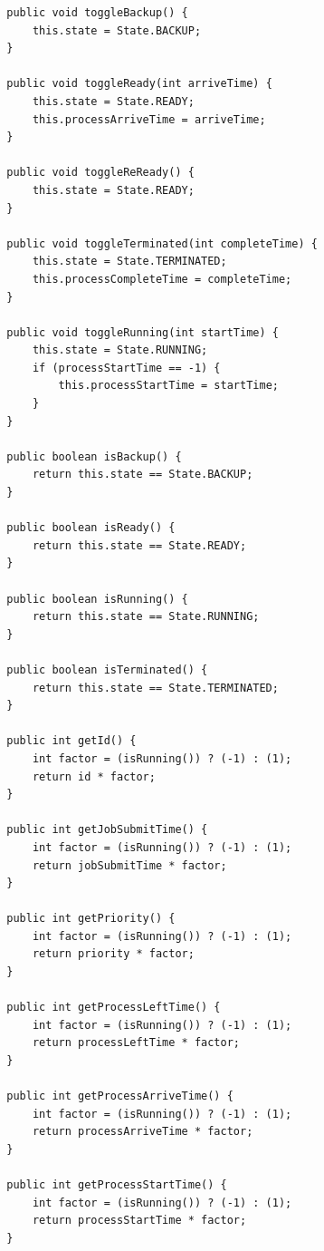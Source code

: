 \documentclass[12pt, a4paper, UTF8]{ctexart}
\begin{document}
\begin{verbatim}
        public void toggleBackup() {
            this.state = State.BACKUP;
        }
    
        public void toggleReady(int arriveTime) {
            this.state = State.READY;
            this.processArriveTime = arriveTime;
        }
    
        public void toggleReReady() {
            this.state = State.READY;
        }
    
        public void toggleTerminated(int completeTime) {
            this.state = State.TERMINATED;
            this.processCompleteTime = completeTime;
        }
    
        public void toggleRunning(int startTime) {
            this.state = State.RUNNING;
            if (processStartTime == -1) {
                this.processStartTime = startTime;
            }
        }
    
        public boolean isBackup() {
            return this.state == State.BACKUP;
        }
    
        public boolean isReady() {
            return this.state == State.READY;
        }
    
        public boolean isRunning() {
            return this.state == State.RUNNING;
        }
    
        public boolean isTerminated() {
            return this.state == State.TERMINATED;
        }
    
        public int getId() {
            int factor = (isRunning()) ? (-1) : (1);
            return id * factor;
        }
    
        public int getJobSubmitTime() {
            int factor = (isRunning()) ? (-1) : (1);
            return jobSubmitTime * factor;
        }
    
        public int getPriority() {
            int factor = (isRunning()) ? (-1) : (1);
            return priority * factor;
        }
    
        public int getProcessLeftTime() {
            int factor = (isRunning()) ? (-1) : (1);
            return processLeftTime * factor;
        }
    
        public int getProcessArriveTime() {
            int factor = (isRunning()) ? (-1) : (1);
            return processArriveTime * factor;
        }
    
        public int getProcessStartTime() {
            int factor = (isRunning()) ? (-1) : (1);
            return processStartTime * factor;
        }
    

\end{verbatim}
\end{document}
